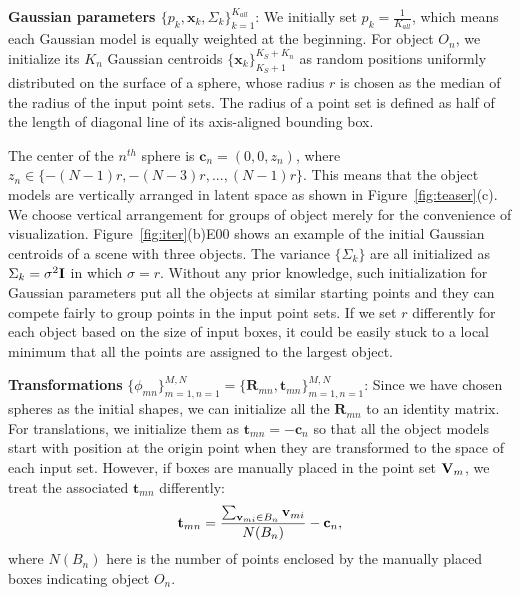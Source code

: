 \noindent\textbf{Gaussian parameters $\{p_k,\mathbf{x}_k,\Sigma_k\}_{k=1}^{K_{all}}$}:
We initially set $p_k=\frac{1}{K_{all}}$, which means each Gaussian model is equally weighted at the beginning. 
%
For object $O_n$, we initialize its $K_n$ Gaussian centroids $\{\mathbf{x}_k\}_{K_S+1}^{K_S+K_n}$ as random positions uniformly distributed on the surface of a sphere, whose radius $r$ is chosen as the median of the radius of the input point sets.
%
%
The radius of a point set is defined as half of the length of diagonal line of its axis-aligned bounding box.
 
%
The center of the $n^{th}$ sphere is $\mathbf{c}_n=(0,0,z_n)$, where $z_n\in \{-(N-1)r,-(N-3)r,...,(N-1)r\}$.
%
This means that the object models are vertically arranged in latent space as shown in Figure~\ref{fig:teaser}(c). 
%
We choose vertical arrangement for groups of object merely for the convenience of visualization.
%
Figure~\ref{fig:iter}(b)E00 shows an example of the initial Gaussian centroids of a scene with three objects.
%
The variance $\{\Sigma_k\}$ are all initialized as $\Sigma_k=\sigma^2 \mathbf{I}$ in which $\sigma=r$.
%
Without any prior knowledge, such initialization for Gaussian parameters put all the objects at similar starting points and they can compete fairly to group points in the input point sets. If we set $r$ differently for each object based on the size of input boxes, it could be easily stuck to a local minimum that all the points are assigned to the largest object.

\noindent\textbf{Transformations} $\{\phi_{mn}\}_{m=1,n=1}^{M,N}=\{\mathbf{R}_{mn},\mathbf{t}_{mn}\}_{m=1,n=1}^{M,N}$:
Since we have chosen spheres as the initial shapes, we can initialize all the $\mathbf{R}_{mn}$ to an identity matrix.
%
%
For translations, we initialize them as $\mathbf{t}_{mn}=- \mathbf{c}_n$ so that all the object models start with position at the origin point when they are transformed to the space of each input set. 
%
However, if boxes are manually placed in the point set $\mathbf{V}_m$, we treat the associated $\mathbf{t}_{mn}$ differently:
%
\begin{equation}
	\label{equ:initt}
	\mathbf{t}_{mn}=\frac{\sum_{\mathbf{v}_{mi} \in B_n}\mathbf{v}_{mi}}{N(B_n)}-\mathbf{c}_n, 
\end{equation}
where $N(B_n)$ here is the number of points enclosed by the manually placed boxes indicating object $O_n$.


